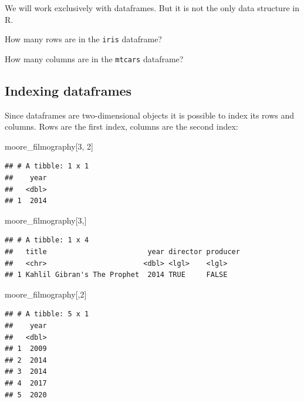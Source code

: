 \documentclass[
]{book}
\makeatletter
\newenvironment{Shaded}{\begin{snugshade}}{\end{snugshade}}
\newcommand{\DecValTok}[1]{\textcolor[rgb]{0.00,0.00,0.81}{#1}}
\newcommand{\NormalTok}[1]{#1}
\newenvironment{kframe}{%
\medskip{}
\setlength{\fboxsep}{.8em}
 \def\at@end@of@kframe{}%
 \ifinner\ifhmode%
  \def\at@end@of@kframe{\end{minipage}}%
  \begin{minipage}{\columnwidth}%
 \fi\fi%
 \def\FrameCommand##1{\hskip\@totalleftmargin \hskip-\fboxsep
 \colorbox{shadecolor}{##1}\hskip-\fboxsep
     \hskip-\linewidth \hskip-\@totalleftmargin \hskip\columnwidth}%
 \MakeFramed {\advance\hsize-\width
   \@totalleftmargin\z@ \linewidth\hsize
   \@setminipage}}%
 {\par\unskip\endMakeFramed%
 \at@end@of@kframe}
\newenvironment{rmdblock}[1]
  {
  \begin{itemize}
  \renewcommand{\labelitemi}{
    \raisebox{-.7\height}[0pt][0pt]{
      {\setkeys{Gin}{width=3em,keepaspectratio}\texttt{[image: images/\#1]}}
    }
  }
  \setlength{\fboxsep}{1em}
  \begin{kframe}
  \item
  }
  {
  \end{kframe}
  \end{itemize}
  }
\newenvironment{rmdtask}
  {\begin{rmdblock}{task}}
  {\end{rmdblock}}
\makeatother
\begin{document}
We will work exclusively with dataframes. But it is not the only data structure in R.

\begin{rmdtask}
How many rows are in the \texttt{iris} dataframe?
\end{rmdtask}

\begin{rmdtask}
How many columns are in the \texttt{mtcars} dataframe?
\end{rmdtask}

\hypertarget{indexing-dataframes}{%
\subsection{Indexing dataframes}\label{indexing-dataframes}}

Since dataframes are two-dimensional objects it is possible to index its rows and columns. Rows are the first index, columns are the second index:

\begin{Shaded}
\begin{Highlighting}[]
\NormalTok{moore_filmography[}\DecValTok{3}\NormalTok{, }\DecValTok{2}\NormalTok{]}
\end{Highlighting}
\end{Shaded}

\begin{verbatim}
## # A tibble: 1 x 1
##    year
##   <dbl>
## 1  2014
\end{verbatim}

\begin{Shaded}
\begin{Highlighting}[]
\NormalTok{moore_filmography[}\DecValTok{3}\NormalTok{,]}
\end{Highlighting}
\end{Shaded}

\begin{verbatim}
## # A tibble: 1 x 4
##   title                        year director producer
##   <chr>                       <dbl> <lgl>    <lgl>   
## 1 Kahlil Gibran's The Prophet  2014 TRUE     FALSE
\end{verbatim}

\begin{Shaded}
\begin{Highlighting}[]
\NormalTok{moore_filmography[,}\DecValTok{2}\NormalTok{]}
\end{Highlighting}
\end{Shaded}

\begin{verbatim}
## # A tibble: 5 x 1
##    year
##   <dbl>
## 1  2009
## 2  2014
## 3  2014
## 4  2017
## 5  2020
\end{verbatim}
\end{document}
